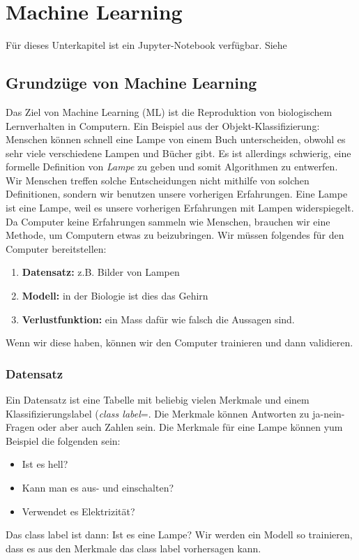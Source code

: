 \chapter{Machine Learning}
\begin{center}
\begin{tcolorbox}[enhanced,width=6in,center upper,
    fontupper=\large,drop fuzzy shadow southwest,
    colframe=blue!50!black,colback=blue!10]
Für dieses Unterkapitel ist ein Jupyter-Notebook verfügbar. Siehe   
\end{tcolorbox}
\end{center}

\section{Grundzüge von Machine Learning}
Das Ziel von Machine Learning (ML) ist die Reproduktion von biologischem Lernverhalten in Computern. 
Ein Beispiel aus der Objekt-Klassifizierung: Menschen können schnell eine Lampe von einem Buch unterscheiden, obwohl es sehr viele verschiedene Lampen und Bücher gibt. 
Es ist allerdings schwierig, eine formelle Definition von \textit{Lampe} zu geben und somit Algorithmen zu entwerfen. 
Wir Menschen treffen solche Entscheidungen nicht mithilfe von solchen Definitionen, sondern wir benutzen unsere vorherigen Erfahrungen. Eine Lampe ist eine Lampe, weil es unsere vorherigen Erfahrungen mit Lampen widerspiegelt.\\

Da Computer keine Erfahrungen sammeln wie Menschen, brauchen wir eine Methode, um Computern etwas zu beizubringen. 
Wir müssen folgendes für den Computer bereitstellen:
\begin{enumerate}
    \item \textbf{Datensatz: } z.B. Bilder von Lampen
    \item \textbf{Modell: } in der Biologie ist dies das Gehirn
    \item \textbf{Verlustfunktion: } ein Mass dafür wie falsch die Aussagen sind.
\end{enumerate}
Wenn wir diese haben, können wir den Computer trainieren und dann validieren. 

\subsection{Datensatz}
Ein Datensatz ist eine Tabelle mit beliebig vielen Merkmale und einem Klassifizierungslabel (\textit{class label}=. Die Merkmale können Antworten zu ja-nein-Fragen oder aber auch Zahlen sein. Die Merkmale für eine Lampe können yum Beispiel die folgenden sein:
\begin{itemize}
    \item Ist es hell?
    \item Kann man es aus- und einschalten?
    \item Verwendet es Elektrizität?
\end{itemize}
Das class label ist dann: Ist es eine Lampe?
Wir werden ein Modell so trainieren, dass es aus den Merkmale das class label vorhersagen kann. 

